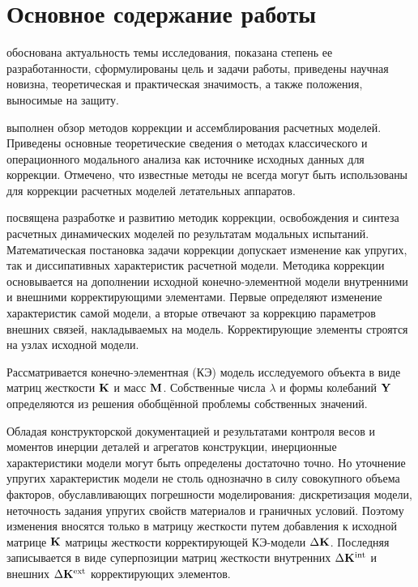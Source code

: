 
\section*{Основное содержание работы}


 обоснована актуальность темы исследования, показана степень ее разработанности, сформулированы цель и задачи работы, приведены научная новизна, теоретическая и практическая значимость, а также положения, выносимые на защиту.


 выполнен обзор методов коррекции и ассемблирования расчетных моделей. Приведены основные теоретические сведения о методах классического и операционного модального анализа как источнике исходных данных для коррекции. Отмечено, что известные методы не всегда могут быть использованы для коррекции расчетных моделей летательных аппаратов.


 посвящена разработке и развитию методик коррекции, освобождения и синтеза расчетных динамических моделей по результатам модальных испытаний. Математическая постановка задачи коррекции допускает изменение как упругих, так и диссипативных характеристик расчетной модели. Методика коррекции основывается на дополнении исходной конечно-элементной модели внутренними и внешними корректирующими элементами. Первые определяют изменение характеристик самой модели, а вторые отвечают за коррекцию параметров внешних связей, накладываемых на модель. Корректирующие элементы строятся на узлах исходной модели. 

Рассматривается конечно-элементная (КЭ) модель исследуемого объекта в виде матриц жесткости $ \mathbf{K} $ и масс $ \mathbf{M} $. Собственные числа $ \lambda $ и формы колебаний $ \mathbf{Y} $ определяются из решения обобщённой проблемы собственных значений.

Обладая конструкторской документацией и результатами контроля весов и моментов инерции деталей и агрегатов конструкции, инерционные характеристики модели могут быть определены достаточно точно. Но уточнение упругих характеристик модели не столь однозначно в силу совокупного объема факторов, обуславливающих погрешности моделирования: дискретизация модели, неточность задания упругих свойств материалов и граничных условий. Поэтому изменения вносятся только в матрицу жесткости путем добавления к исходной матрице $ \mathbf{K} $ матрицы жесткости корректирующей КЭ-модели $ \Delta \mathbf{K} $. Последняя записывается в виде суперпозиции матриц жесткости внутренних $ \Delta \mathbf{K} ^ {\text{int}} $ и внешних $ \Delta \mathbf{K} ^ {\text{ext}} $ корректирующих элементов.

